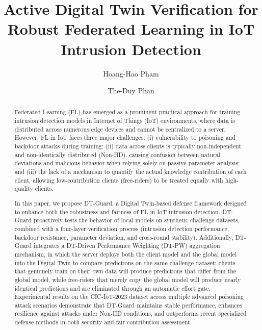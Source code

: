 \documentclass[runningheads]{llncs}
\begin{document}
%
\title{Active Digital Twin Verification for Robust Federated Learning in IoT Intrusion Detection}
%
%
\author{Hoang-Hao Pham \and
The-Duy Phan}
%
%
%
\maketitle
%
\begin{abstract}
    Federated Learning (FL) has emerged as a prominent practical approach for training intrusion detection models in Internet of Things (IoT) environments, where data is distributed across numerous edge devices and cannot be centralized to a server. However, FL in IoT faces three major challenges: (i) vulnerability to poisoning and backdoor attacks during training; (ii) data across clients is typically non-independent and non-identically distributed (Non-IID), causing confusion between natural deviations and malicious behavior when relying solely on passive parameter analysis; and (iii) the lack of a mechanism to quantify the actual knowledge contribution of each client, allowing low-contribution clients (free-riders) to be treated equally with high-quality clients.

    In this paper, we propose DT-Guard, a Digital Twin-based defense framework designed to enhance both the robustness and fairness of FL in IoT intrusion detection. DT-Guard proactively tests the behavior of local models on synthetic challenge datasets, combined with a four-layer verification process (intrusion detection performance, backdoor resistance, parameter deviation, and cross-round stability). Additionally, DT-Guard integrates a DT-Driven Performance Weighting (DT-PW) aggregation mechanism, in which the server deploys both the client model and the global model into the Digital Twin to compare predictions on the same challenge dataset; clients that genuinely train on their own data will produce predictions that differ from the global model, while free-riders that merely copy the global model will produce nearly identical predictions and are eliminated through an automatic effort gate. Experimental results on the CIC-IoT-2023 dataset across multiple advanced poisoning attack scenarios demonstrate that DT-Guard maintains stable performance, enhances resilience against attacks under Non-IID conditions, and outperforms recent specialized defense methods in both security and fair contribution assessment.

\end{abstract}
%
%
%
\end{document}
